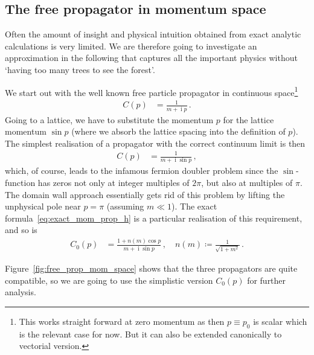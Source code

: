 \documentclass[a4paper]{article}
\DeclareMathOperator{\im}{i}
\begin{document}
	\subsection{The free propagator in momentum space}
	Often the amount of insight and physical intuition obtained from exact analytic calculations is very limited. We are therefore going to investigate an approximation in the following that captures all the important physics without `having too many trees to see the forest'.
	
	We start out with the well known free particle propagator in continuous space\footnote{This works straight forward at zero momentum as then $p\equiv p_0$ is scalar which is the relevant case for now. But it can also be extended canonically to vectorial version.}
	\begin{align}
		C(p) &= \frac{1}{m+\im p}\,.
	\end{align}
	Going to a lattice, we have to substitute the momentum $p$ for the lattice momentum $\sin p$ (where we absorb the lattice spacing into the definition of $p$). The simplest realisation of a propagator with the correct continuum limit is then
	\begin{align}
		C(p) &= \frac{1}{m+\im \sin p}\,,
	\end{align}
	which, of course, leads to the infamous fermion doubler problem since the $\sin$-function has zeros not only at integer multiples of $2\pi$, but also at multiples of $\pi$. The domain wall approach essentially gets rid of this problem by lifting the unphysical pole near $p=\pi$ (assuming $m\ll 1$). The exact formula~\eqref{eq:exact_mom_prop_h} is a particular realisation of this requirement, and so is
	\begin{align}
		C_0(p) &= \frac{1+n(m)\cos p}{m+\im \sin p}\,,\quad n(m) \coloneqq \frac{1}{\sqrt{1+m^2}}\,.
	\end{align}

	Figure~\ref{fig:free_prop_mom_space} shows that the three propagators are quite compatible, so we are going to use the simplistic version $C_0(p)$ for further analysis.
\end{document}

